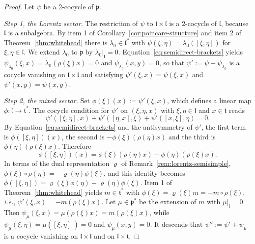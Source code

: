 	\begin{proof}
		Let $\psi$ be a $2$-cocycle of $\mathfrak{p}$.
		
		\emph{Step 1, the Lorentz sector.} The restriction of $\psi$ to $\mathfrak{l}\times\mathfrak{l}$ is a $2$-cocycle of $\mathfrak{l}$, because $\mathfrak{l}$ is a subalgebra. By item 1 of Corollary~\ref{cor:poincare-structure} and item 2 of Theorem~\ref{thm:whitehead} there is $\lambda_0\in\mathfrak{l}^*$ with $\psi(\xi,\eta)=\lambda_0([\xi,\eta])$ for $\xi,\eta\in\mathfrak{l}$. We extend $\lambda_0$ to $\mathfrak{p}$ by $\lambda_0|_{\mathfrak{t}}=0$. Equation~\eqref{eq:semidirect-brackets} yields $\psi_{\lambda_0}(\xi,x)=\lambda_0(\rho(\xi)x)=0$ and $\psi_{\lambda_0}(x,y)=0$, so that $\psi':=\psi-\psi_{\lambda_0}$ is a cocycle vanishing on $\mathfrak{l}\times\mathfrak{l}$ and satisfying $\psi'(\xi,x)=\psi(\xi,x)$ and $\psi'(x,y)=\psi(x,y)$.
		
		\emph{Step 2, the mixed sector.} Set $\phi(\xi)(x):=\psi'(\xi,x)$, which defines a linear map $\phi:\mathfrak{l}\to\mathfrak{t}^*$. The cocycle condition for $\psi'$ on $(\xi,\eta,x)$ with $\xi,\eta\in\mathfrak{l}$ and $x\in\mathfrak{t}$ reads
		\begin{equation*}
			\psi'([\xi,\eta],x)+\psi'([\eta,x],\xi)+\psi'([x,\xi],\eta)=0.
		\end{equation*}
		By Equation~\eqref{eq:semidirect-brackets} and the antisymmetry of $\psi'$, the first term is $\phi([\xi,\eta])(x)$, the second is $-\phi(\xi)(\rho(\eta)x)$ and the third is $\phi(\eta)(\rho(\xi)x)$. Therefore
		\begin{equation*}
			\phi([\xi,\eta])(x)=\phi(\xi)(\rho(\eta)x)-\phi(\eta)(\rho(\xi)x).
		\end{equation*}
		In terms of the dual representation $\varrho$ of Remark~\ref{rem:lorentz-semisimple}, $\phi(\xi)\circ\rho(\eta)=-\varrho(\eta)\phi(\xi)$, and this identity becomes $\phi([\xi,\eta])=\varrho(\xi)\phi(\eta)-\varrho(\eta)\phi(\xi)$. Item 1 of Theorem~\ref{thm:whitehead} yields $m\in\mathfrak{t}^*$ with $\phi(\xi)=\varrho(\xi)m=-m\circ\rho(\xi)$, \textit{i.e.}, $\psi'(\xi,x)=-m(\rho(\xi)x)$. Let $\mu\in\mathfrak{p}^*$ be the extension of $m$ with $\mu|_{\mathfrak{l}}=0$. Then $\psi_\mu(\xi,x)=\mu(\rho(\xi)x)=m(\rho(\xi)x)$, while $\psi_\mu(\xi,\eta)=\mu([\xi,\eta]_{\mathfrak{l}})=0$ and $\psi_\mu(x,y)=0$. It descends that $\psi'':=\psi'+\psi_\mu$ is a cocycle vanishing on $\mathfrak{l}\times\mathfrak{l}$ and on $\mathfrak{l}\times\mathfrak{t}$.
		

\end{proof}
